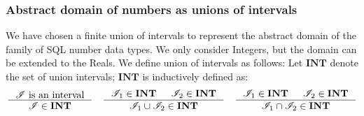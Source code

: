 \subsubsection{Abstract domain of numbers as unions of intervals}\label{subsubsec:abstract_domains_numbers}
We have chosen a finite union of intervals to represent the abstract domain of the family of SQL number data types.
We only consider Integers, but the domain can be extended to the Reals.
We define union of intervals as follows:
Let $\mathbf{INT}$ denote the set of union intervals; $\mathbf{INT}$ is inductively defined as:
\[
    \inference{\mathscr{I} \text{ is an interval}}{\mathscr{I} \in \mathbf{INT}} \quad
    \inference{\mathscr{I}_1 \in \textbf{INT} & \mathscr{I}_2 \in \textbf{INT}}{\mathscr{I}_1 \cup  \mathscr{I}_2 \in \mathbf{INT}} \quad
    \inference{\mathscr{I}_1 \in \textbf{INT} & \mathscr{I}_2 \in \textbf{INT}}{\mathscr{I}_1 \cap  \mathscr{I}_2 \in \mathbf{INT}}
\]
%


